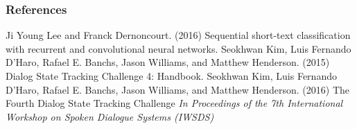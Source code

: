\documentclass{beamer}
\begin{document}
\begin{frame}
\frametitle{References}
\footnotesize{
\begin{thebibliography}{99} 

Ji Young Lee and Franck Dernoncourt. (2016)
\newblock Sequential short-text classification with recurrent and convolutional neural networks.
\newblock \emph{}
 Seokhwan Kim, Luis Fernando D'Haro,
Rafael E. Banchs, Jason Williams, and Matthew Henderson. (2015)
\newblock Dialog  State  Tracking  Challenge  4: Handbook.
\newblock \emph{}
 Seokhwan Kim, Luis Fernando D'Haro,
Rafael E. Banchs, Jason Williams, and Matthew Henderson. (2016)
\newblock The Fourth Dialog State Tracking Challenge
\newblock \emph{In Proceedings of the 7th International Workshop on Spoken Dialogue Systems (IWSDS)}

\end{thebibliography}
}
\end{frame}

\end{document}
